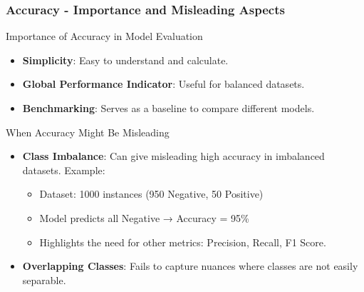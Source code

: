 \documentclass[aspectratio=169]{beamer}
\begin{document}
\begin{frame}[fragile]
    \frametitle{Accuracy - Importance and Misleading Aspects}
    \begin{block}{Importance of Accuracy in Model Evaluation}
        \begin{itemize}
            \item \textbf{Simplicity}: Easy to understand and calculate.
            \item \textbf{Global Performance Indicator}: Useful for balanced datasets.
            \item \textbf{Benchmarking}: Serves as a baseline to compare different models.
        \end{itemize}
    \end{block}

    \begin{block}{When Accuracy Might Be Misleading}
        \begin{itemize}
            \item \textbf{Class Imbalance}: Can give misleading high accuracy in imbalanced datasets. Example:
            \begin{itemize}
                \item Dataset: 1000 instances (950 Negative, 50 Positive) 
                \item Model predicts all Negative → Accuracy = 95\%
                \item Highlights the need for other metrics: Precision, Recall, F1 Score.
            \end{itemize}

            \item \textbf{Overlapping Classes}: Fails to capture nuances where classes are not easily separable.
        \end{itemize}
    \end{block}
\end{frame}
\end{document}
